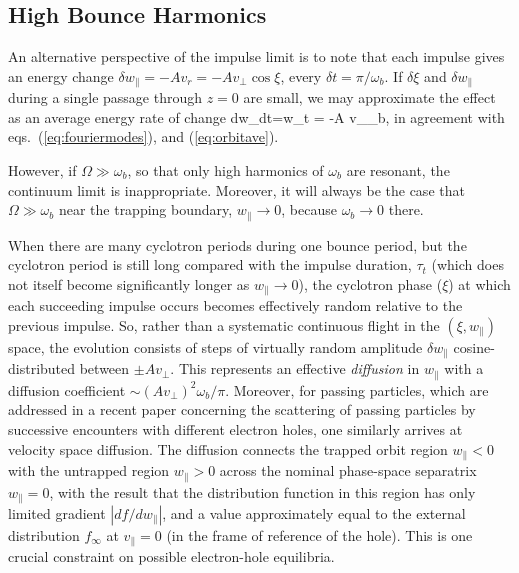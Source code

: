 \documentclass{agujournal2019}
\let\oldequation\equation
\let\oldendequation\endequation
\renewenvironment{equation}
  {\linenomathNonumbers\oldequation}
  {\oldendequation\endlinenomath}
\def\wp{w_\parallel}
\begin{document}
\subsection{High Bounce Harmonics}

An alternative perspective of the impulse limit is to note that each
impulse gives an energy change
$\delta \wp= -Av_r=-Av_\perp\cos\xi$, every
$\delta t=\pi/\omega_b$. If $\delta \xi$ and $\delta \wp$
during a single passage through $z=0$ are small, we may approximate the
effect as an average energy rate of change
\begin{equation}
  \label{eq:energychange}
  {d\wp\over dt}={\delta \wp\over\delta t} 
    = -{A v_\perp \omega_b\over \pi}\cos\xi,
\end{equation}
in agreement with eqs.\ (\ref{eq:fouriermodes}), and  
(\ref{eq:orbitave}).

However, if $\Omega\gg\omega_b$, so that only high harmonics of
$\omega_b$ are resonant, the continuum limit is
inappropriate. Moreover, it will always be the case that
$\Omega\gg\omega_b$ near the trapping boundary, $\wp\to 0$, because
$\omega_b\to 0$ there.


When there are many cyclotron periods during one bounce
period, but the cyclotron period is still long compared with the
impulse duration, $\tau_t$ (which does not itself become significantly longer as
$\wp\to 0$), the cyclotron phase ($\xi$) at which each succeeding impulse occurs
becomes effectively random relative to the previous
impulse. So, rather than a systematic continuous flight in the
$(\xi,\wp)$ space, the evolution consists of steps of
virtually random amplitude $\delta \wp$ cosine-distributed
between $\pm Av_\perp$. This represents an effective \emph{diffusion} in
$\wp$ with a diffusion coefficient $\sim(Av_\perp)^2\omega_b/\pi$.
 Moreover, for passing particles, which are
addressed in a recent paper
\cite{Vasko2018} concerning the scattering of passing particles by
successive encounters with different electron holes, one similarly arrives at velocity space diffusion.
The diffusion connects the trapped orbit region $\wp <0$ with
the untrapped region $\wp >0$ across the nominal phase-space
separatrix $\wp=0$, with the result that the distribution
function in this region has only limited gradient $|df/d\wp|$,
and a value approximately equal to the external distribution
$f_\infty$ at $v_\parallel=0$ (in the frame of reference of the hole).
This is one crucial constraint on possible electron-hole equilibria.
\end{document}
